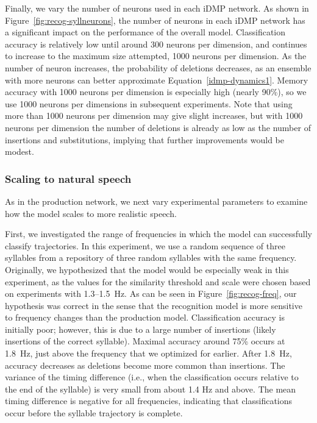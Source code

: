 Finally, we vary the number of neurons
used in each iDMP network.
As shown in Figure~\ref{fig:recog-syllneurons},
the number of neurons in each iDMP network
has a significant impact on the performance
of the overall model.
Classification accuracy is relatively low
until around 300 neurons per dimension,
and continues to increase
to the maximum size attempted,
1000 neurons per dimension.
As the number of neuron increases,
the probability of deletions decreases,
as an ensemble with more neurons
can better approximate Equation~\eqref{idmp-dynamics1}.
Memory accuracy with 1000 neurons per dimension
is especially high (nearly 90\%),
so we use 1000 neurons per dimensions
in subsequent experiments.
Note that using more than 1000 neurons per dimension
may give slight increases,
but with 1000 neurons per dimension
the number of deletions is already
as low as the number of insertions
and substitutions,
implying that further improvements
would be modest.

\subsubsection{Scaling to natural speech}

As in the production network,
we next vary experimental parameters
to examine how the model scales
to more realistic speech.


First, we investigated the
range of frequencies in which the model
can successfully classify trajectories.
In this experiment, we use a random sequence
of three syllables from a
repository of three random syllables
with the same frequency.
Originally, we hypothesized that the
model would be especially weak in this experiment,
as the values for the similarity threshold
and scale were chosen based on
experiments with 1.3--1.5~Hz.
As can be seen in Figure~\ref{fig:recog-freq},
our hypothesis was correct in the sense that
the recognition model
is more sensitive to frequency changes
than the production model.
Classification accuracy is initially poor;
however, this is due to a large number
of insertions
(likely insertions of the correct syllable).
Maximal accuracy around 75\%
occurs at 1.8~Hz,
just above the frequency that we
optimized for earlier.
After 1.8~Hz, accuracy decreases
as deletions become more common
than insertions.
The variance of the timing difference
(i.e., when the classification occurs
relative to the end of the syllable)
is very small from about 1.4 Hz and above.
The mean timing difference
is negative for all frequencies,
indicating that classifications
occur before the syllable trajectory
is complete.

